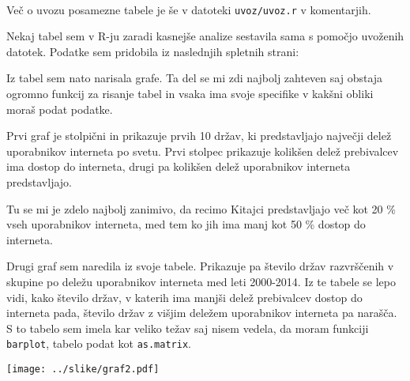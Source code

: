 \documentclass[11pt,a4paper]{article}
\begin{document}
\\Več o uvozu posamezne tabele je še v datoteki \verb|uvoz/uvoz.r| v komentarjih. 

\smallskip
Nekaj tabel sem v R-ju zaradi kasnejše analize sestavila sama s pomočjo uvoženih datotek.
\bigskip
Podatke sem pridobila iz naslednjih spletnih strani:

\bigskip
Iz tabel sem nato narisala grafe. Ta del se mi zdi najbolj zahteven saj obstaja ogromno funkcij za risanje tabel in vsaka ima svoje specifike v kakšni obliki moraš podat podatke.

\newpage
Prvi graf je stolpični in prikazuje prvih 10 držav, ki predstavljajo največji delež uporabnikov interneta po svetu. Prvi stolpec prikazuje kolikšen delež prebivalcev ima dostop do interneta, drugi pa kolikšen delež uporabnikov interneta predstavljajo.

Tu se mi je zdelo najbolj zanimivo, da recimo Kitajci predstavljajo več kot 20 \% vseh uporabnikov interneta, med tem ko jih ima manj kot 50 \% dostop do interneta.



\newpage
Drugi graf sem naredila iz svoje tabele. Prikazuje pa število držav razvrščenih v skupine po deležu uporabnikov interneta med leti 2000-2014. Iz te tabele se lepo vidi, kako število držav, v katerih ima manjši delež prebivalcev dostop do interneta pada, število držav z višjim deležem uporabnikov interneta pa narašča.
S to tabelo sem imela kar veliko težav saj nisem vedela, da moram funkciji \verb|barplot|, tabelo podat kot \verb|as.matrix|.

\texttt{[image: ../slike/graf2.pdf]}
\end{document}
